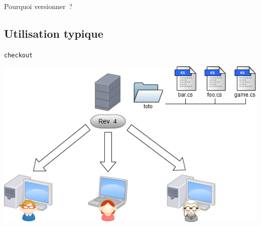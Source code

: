 \begin{frame}{Pourquoi versionner~?}
\begin{center}
  \end{center}
\end{frame}

\subsection{Utilisation typique}

\begin{frame}
  \texttt{checkout}
  \begin{center}
    \includegraphics[scale=0.52]{images/1-CheckOut.png}
  \end{center}
\end{frame}

